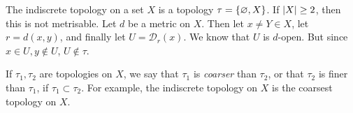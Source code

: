 \begin{example}
	The indiscrete topology on a set \( X \) is a topology \( \tau = \qty{ \varnothing, X } \).
	If \( \abs{X} \geq 2 \), then this is not metrisable.
	Let \( d \) be a metric on \( X \).
	Then let \( x \neq Y \in X \), let \( r = d(x,y) \), and finally let \( U = \mathcal D_r(x) \).
	We know that \( U \) is \( d \)-open.
	But since \( x \in U, y \not\in U \), \( U \not\in \tau \).
\end{example}
\begin{definition}
	If \( \tau_1, \tau_2 \) are topologies on \( X \), we say that \( \tau_1 \) is \textit{coarser} than \( \tau_2 \), or that \( \tau_2 \) is finer than \( \tau_1 \), if \( \tau_1 \subset \tau_2 \).
	For example, the indiscrete topology on \( X \) is the coarsest topology on \( X \).
\end{definition}
